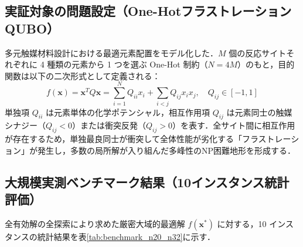 \documentclass[11pt,a4paper]{ltjsarticle}
\begin{document}
\subsection{実証対象の問題設定（One-HotフラストレーションQUBO）}
多元触媒材料設計における最適元素配置をモデル化した．$M$ 個の反応サイトそれぞれに 4 種類の元素から 1 つを選ぶ One-Hot 制約（$N = 4M$）のもと，目的関数は以下の二次形式として定義される：
\begin{equation}
f(\bm{x}) = \bm{x}^T Q \bm{x} = \sum_{i=1}^N Q_{ii} x_i + \sum_{i < j} Q_{ij} x_i x_j, \quad Q_{ij} \in [-1, 1]
\end{equation}
単独項 $Q_{ii}$ は元素単体の化学ポテンシャル，相互作用項 $Q_{ij}$ は元素同士の触媒シナジー（$Q_{ij} < 0$）または衝突反発（$Q_{ij} > 0$）を表す．全サイト間に相互作用が存在するため，単独最良同士が衝突して全体性能が劣化する「フラストレーション」が発生し，多数の局所解が入り組んだ多峰性のNP困難地形を形成する．

\subsection{大規模実測ベンチマーク結果（10インスタンス統計評価）}
全有効解の全探索により求めた厳密大域的最適解 $f(\bm{x}^*)$ に対する，10 インスタンスの統計結果を表\ref{tab:benchmark_n20_n32}に示す．
\end{document}
